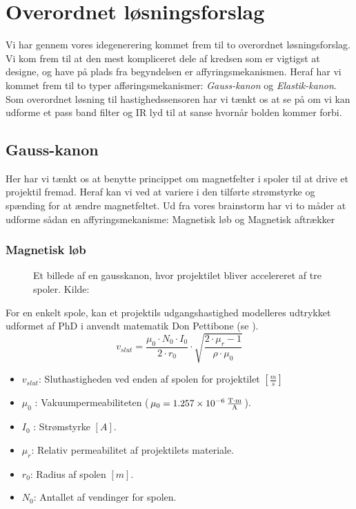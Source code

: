\section{Overordnet løsningsforslag}

Vi har gennem vores idegenerering kommet frem til to overordnet løsningsforslag. Vi kom frem til at den mest kompliceret dele af kredsen som er vigtigst at designe, og have på plads fra begyndelsen er affyringsmekanismen.
Heraf har vi kommet frem til to typer afføringsmekanismer: \emph{Gauss-kanon} og \emph{Elastik-kanon}.
Som overordnet løsning til hastighedssensoren har vi tænkt os at se på om vi kan udforme et pass band filter og IR lyd til at sanse hvornår bolden kommer forbi.

\subsection{Gauss-kanon}
Her har vi tænkt os at benytte princippet om magnetfelter i spoler til at drive et projektil fremad. Heraf kan vi ved at variere i den tilførte strømstyrke og spænding for at ændre magnetfeltet.
Ud fra vores brainstorm har vi to måder at udforme sådan en affyringsmekanisme: Magnetisk løb og Magnetisk aftrækker
\subsubsection{Magnetisk løb}
\begin{figure}[H]
	\centering
	\caption{Et billede af en gausskanon, hvor projektilet bliver accelereret af tre spoler. Kilde: \cite{WikiGaussCanon}}
	\label{fig:loeb}
\end{figure}
For en enkelt spole, kan et projektils udgangshastighed modelleres udtrykket udformet af PhD i anvendt matematik Don Pettibone (se \cite{gaussRifleModel}).
\[
	v_{slut} = \frac{\mu_0 \cdot N_0 \cdot I_0}{2 \cdot r_0} \cdot \sqrt{\frac{2 \cdot \mu_r - 1}{\rho \cdot \mu_0}}
\]
\begin{itemize}
	\item $v_{slut}$: Sluthastigheden ved enden af spolen for projektilet $[\frac{\si{m}}{\si{s}}]$
	\item $\mu_0$ : Vakuumpermeabiliteten ($\mu_0 = \SI{1.257d-6}{\frac{T \cdot m}{A}}$).
	\item $I_0$ : Strømstyrke $[A]$.
	\item  $\mu_r$: Relativ permeabilitet af projektilets materiale.
	\item $r_0$: Radius af spolen $\si{[m]}$.
	\item $N_0$: Antallet af vendinger for spolen.
\end{itemize}

